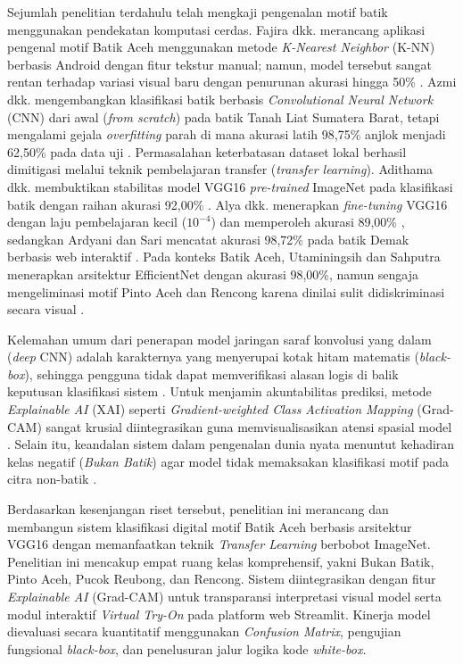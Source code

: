 \documentclass[10pt,a4paper]{article}
\begin{document}
Sejumlah penelitian terdahulu telah mengkaji pengenalan motif batik menggunakan pendekatan komputasi cerdas. Fajira dkk. merancang aplikasi pengenal motif Batik Aceh menggunakan metode \textit{K-Nearest Neighbor} (K-NN) berbasis Android dengan fitur tekstur manual; namun, model tersebut sangat rentan terhadap variasi visual baru dengan penurunan akurasi hingga 50\% \cite{fajira2022}. Azmi dkk. mengembangkan klasifikasi batik berbasis \textit{Convolutional Neural Network} (CNN) dari awal (\textit{from scratch}) pada batik Tanah Liat Sumatera Barat, tetapi mengalami gejala \textit{overfitting} parah di mana akurasi latih 98,75\% anjlok menjadi 62,50\% pada data uji \cite{azmi2023}. Permasalahan keterbatasan dataset lokal berhasil dimitigasi melalui teknik pembelajaran transfer (\textit{transfer learning}). Adithama dkk. membuktikan stabilitas model VGG16 \textit{pre-trained} ImageNet pada klasifikasi batik dengan raihan akurasi 92,00\% \cite{adithama2023}. Alya dkk. menerapkan \textit{fine-tuning} VGG16 dengan laju pembelajaran kecil ($10^{-4}$) dan memperoleh akurasi 89,00\% \cite{alya2023}, sedangkan Ardyani dan Sari mencatat akurasi 98,72\% pada batik Demak berbasis web interaktif \cite{ardyani2024}. Pada konteks Batik Aceh, Utaminingsih dan Sahputra menerapkan arsitektur EfficientNet dengan akurasi 98,00\%, namun sengaja mengeliminasi motif Pinto Aceh dan Rencong karena dinilai sulit didiskriminasi secara visual \cite{utaminingsih2024}.

Kelemahan umum dari penerapan model jaringan saraf konvolusi yang dalam (\textit{deep} CNN) adalah karakternya yang menyerupai kotak hitam matematis (\textit{black-box}), sehingga pengguna tidak dapat memverifikasi alasan logis di balik keputusan klasifikasi sistem \cite{anders2026}. Untuk menjamin akuntabilitas prediksi, metode \textit{Explainable AI} (XAI) seperti \textit{Gradient-weighted Class Activation Mapping} (Grad-CAM) sangat krusial diintegrasikan guna memvisualisasikan atensi spasial model \cite{anders2026, muchtar2025}. Selain itu, keandalan sistem dalam pengenalan dunia nyata menuntut kehadiran kelas negatif (\textit{Bukan Batik}) agar model tidak memaksakan klasifikasi motif pada citra non-batik \cite{bendale2016, brigato2022}.

Berdasarkan kesenjangan riset tersebut, penelitian ini merancang dan membangun sistem klasifikasi digital motif Batik Aceh berbasis arsitektur VGG16 dengan memanfaatkan teknik \textit{Transfer Learning} berbobot ImageNet. Penelitian ini mencakup empat ruang kelas komprehensif, yakni Bukan Batik, Pinto Aceh, Pucok Reubong, dan Rencong. Sistem diintegrasikan dengan fitur \textit{Explainable AI} (Grad-CAM) untuk transparansi interpretasi visual model serta modul interaktif \textit{Virtual Try-On} pada platform web Streamlit. Kinerja model dievaluasi secara kuantitatif menggunakan \textit{Confusion Matrix}, pengujian fungsional \textit{black-box}, dan penelusuran jalur logika kode \textit{white-box}.
\end{document}
